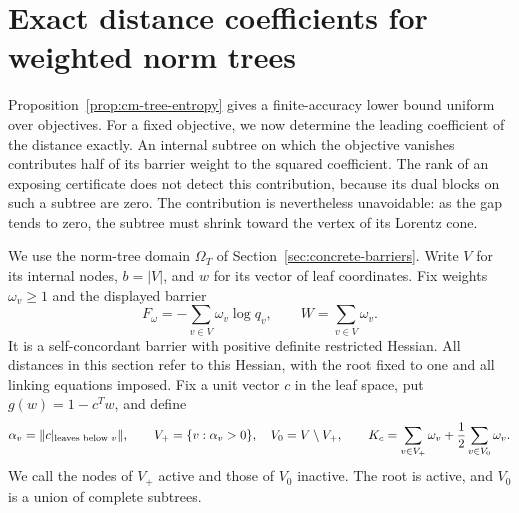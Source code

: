 \section{Exact distance coefficients for weighted norm trees}
\label{sec:tree-distance}

Proposition~\ref{prop:cm-tree-entropy} gives a finite-accuracy lower
bound uniform over objectives.  For a fixed objective, we now
determine the leading coefficient of the distance exactly.  An internal
subtree on which the objective vanishes contributes half of its barrier
weight to the squared coefficient.  The rank of an exposing certificate
does not detect this contribution, because its dual blocks on such a
subtree are zero.  The contribution is nevertheless unavoidable:
as the gap tends to zero, the subtree must shrink toward the vertex of its
Lorentz cone.

We use the norm-tree domain $\Omega_T$ of
Section~\ref{sec:concrete-barriers}.  Write $V$ for its internal nodes,
$b=|V|$, and $w$ for its vector of leaf coordinates.  Fix weights
$\omega_v\geq1$ and the displayed barrier
\[
 F_\omega=-\sum_{v\in V}\omega_v\log q_v,\qquad
 W=\sum_{v\in V}\omega_v.
\]
It is a self-concordant barrier with positive definite restricted Hessian.
All distances in this section refer to this Hessian, with the root fixed
to one and all linking equations imposed.  Fix a unit vector $c$ in the
leaf space, put $g(w)=1-c^Tw$, and define
\[
 \alpha_v=\lVert c|_{\text{leaves below }v}\rVert,\qquad
 V_+=\{v:\alpha_v>0\},\quad V_0=V\setminus V_+,
 \qquad
 K_c=\sum_{v\in V_+}\omega_v+\frac12\sum_{v\in V_0}\omega_v.
\]
We call the nodes of $V_+$ active and those of $V_0$ inactive.  The root
is active, and $V_0$ is a union of complete subtrees.

